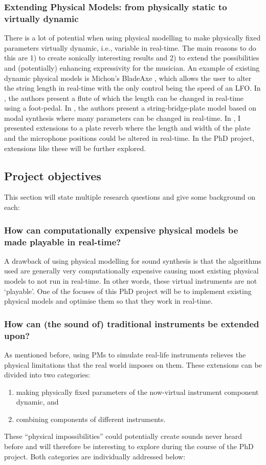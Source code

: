 \subsubsection*{Extending Physical Models: from physically static to virtually dynamic}
There is a lot of potential when using physical modelling to make physically fixed parameters virtually dynamic, i.e., variable in real-time. The main reasons to do this are 1) to create sonically interesting results and 2) to extend the possibilities and (potentially) enhancing expressivity for the musician.
An example of existing dynamic physical models is Michon’s BladeAxe \cite{Michon2016}, which allows the user to alter the string length in real-time with the only control being the speed of an LFO. In \cite{Gelineck2005}, the authors present a flute of which the length can be changed in real-time using a foot-pedal. In \cite{Walstijn2017}, the authors present a string-bridge-plate model based on modal synthesis where many parameters can be changed in real-time. In \cite{Willemsen2017}, I presented extensions to a plate reverb where the length and width of the plate and the microphone positions could be altered in real-time. In the PhD project, extensions like these will be further explored.

\subsection{Project objectives}
This section will state multiple research questions and give some background on each:
\subsubsection*{How can computationally expensive physical models be made playable in real-time?}
A drawback of using physical modelling for sound synthesis is that the algorithms used are generally very computationally expensive causing most existing physical models to not run in real-time. In other words, these virtual instruments are not ‘playable’. One of the focuses of this PhD project will be to implement existing physical models and optimise them so that they work in real-time. 

\subsubsection*{How can (the sound of) traditional instruments be extended upon?}
As mentioned before, using PMs to simulate real-life instruments relieves the physical limitations that the real world imposes on them. These extensions can be divided into two categories: 
\begin{enumerate}
    \item making physically fixed parameters of the now-virtual instrument component dynamic, and
    \item combining components of different instruments.
\end{enumerate}
These ``physical impossibilities'' could potentially create sounds never heard before and will therefore be interesting to explore during the course of the PhD project. Both categories are individually addressed below:
\\


